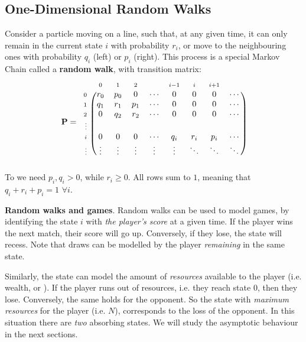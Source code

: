 \documentclass[../template.tex]{subfiles}
\begin{document}
\subsection{One-Dimensional Random Walks}
Consider a particle moving on a line, such that, at any given time, it can only remain in the current state $i$ with probability $r_i$, or move to the neighbouring ones with probability $q_i$ (left) or $p_i$ (right). This process is a special Markov Chain called a \textbf{random walk}, with transition matrix:
\begin{align*}
    \textbf{P} =  \begin{blockarray}{l*{9}{c}}
        \begin{block}{l*{9}{>{\scriptstyle}c<{}}}
            & 0 & 1 & 2 & & i-1 & i & i+1 &\\
        \end{block}
        \begin{block}{>{\scriptstyle}r<{}(*{9}{c})}
            0 & r_0 & p_0 & 0 & \cdots & 0 & 0 & 0 & \cdots \\
            1 & q_1 & r_1 & p_1 & \cdots & 0 & 0 & 0 & \cdots\\
            2 & 0 & q_2 & r_2 & \cdots & 0 & 0 & 0 & \cdots\\
            \vdots &&&&&&&&\\
            i & 0 & 0 & 0 & \cdots & q_i & r_i & p_i & \cdots\\
            \vdots & \vdots & \vdots & \vdots & \vdots & \vdots & \ddots & \ddots & \ddots \\
        \end{block}
    \end{blockarray}
\end{align*} 
To  we need $p_i, q_i > 0$, while $r_i \geq 0$. All rows sum to $1$, meaning that $q_i + r_i + p_i = 1$ $\forall i$.

\begin{appr}
    \textbf{Random walks and games}. Random walks can be used to model games, by identifying the state $i$ with \textit{the player's score} at a given time. If the player wins the next match, their score will go up. Conversely, if they lose, the state will recess. Note that draws can be modelled by the player \textit{remaining} in the same state.
    
    \medskip

    Similarly, the state can model the amount of \textit{resources} available to the player (i.e. wealth, or ). If the player runs out of resources, i.e. they reach state $0$, then they lose. Conversely, the same holds for the opponent. So the state with \textit{maximum resources} for the player (i.e. $N$), corresponds to the loss of the opponent. In this situation there are \textit{two} absorbing states. We will study the asymptotic behaviour in the next sections.  
\end{appr}
\end{document}
